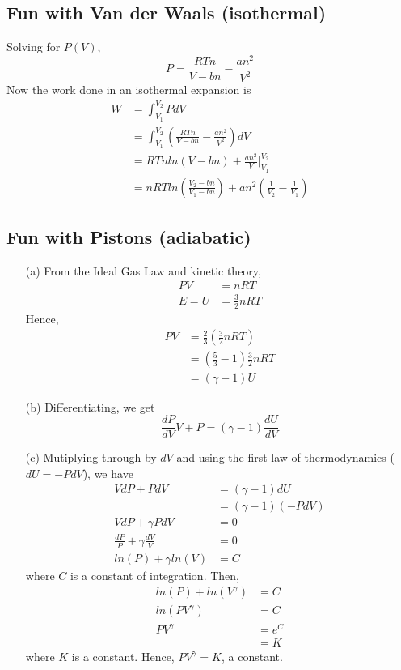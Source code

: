 \documentclass{article}
\begin{document}
\subsection{Fun with Van der Waals (isothermal)}

Solving for $P(V)$,
\begin{equation}
P = \frac{RTn}{V-bn} - \frac{an^2}{V^2}
\end{equation}
Now the work done in an isothermal expansion is
\begin{align*}
W &= \int_{V_1}^{V_2} PdV \\
&= \int_{V_1}^{V_2}\left(\frac{RTn}{V-bn} - \frac{an^2}{V^2}\right)dV \\
&= RTn ln(V-bn) + \frac{an^2}{V}|_{V_1}^{V_2} \\
&= nRT ln\left(\frac{V_2-bn}{V_1-bn}\right) + an^2\left(\frac{1}{V_2}-\frac{1}{V_1}\right)
\end{align*}

\subsection{Fun with Pistons (adiabatic)}

\begin{itemize}
	\item[(a)] From the Ideal Gas Law and kinetic theory,
	\begin{align*}
	PV &= nRT \\
	E = U &= \frac{3}{2}nRT
	\end{align*}
	Hence,
	\begin{align*}
	PV &= \frac{2}{3}\left(\frac{3}{2}nRT\right) \\
	&= \left(\frac{5}{3}-1\right)\frac{3}{2}nRT \\
	&= (\gamma - 1)U
	\end{align*}
	\item[(b)] Differentiating, we get
	\begin{equation}
	\frac{dP}{dV} V + P = (\gamma - 1)\frac{dU}{dV}
	\end{equation}
	\item[(c)] Mutiplying through by $dV$ and using the first law of thermodynamics ($dU = -PdV$), we have
	\begin{align*}
	VdP + PdV &= (\gamma - 1)dU \\
	&= (\gamma - 1)(-PdV) \\
	VdP + \gamma P dV &= 0 \\
	\frac{dP}{P} + \gamma\frac{dV}{V} &= 0 \\
	ln(P) + \gamma ln(V) &= C
	\end{align*}
	where $C$ is a constant of integration. Then,
	\begin{align*}
	ln(P) + ln\left(V^{\gamma}\right) &= C \\
	ln\left(PV^{\gamma}\right) &= C \\
	PV^{\gamma} &= e^C \\
	&= K
	\end{align*}
	where $K$ is a constant. Hence, $PV^{\gamma}=K$, a constant.
\end{itemize}
\end{document}
